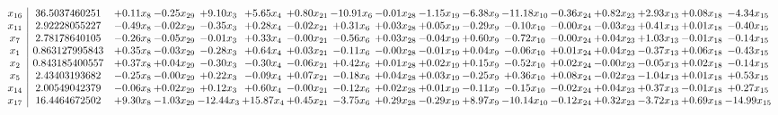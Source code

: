\documentclass[9pt]{article}
\begin{document}
\[\begin{array}{c| c c@{\hskip 2pt} c@{\hskip 2pt} c@{\hskip 2pt} c@{\hskip 2pt} c@{\hskip 2pt} c@{\hskip 2pt} c@{\hskip 2pt} c@{\hskip 2pt} c@{\hskip 2pt} c@{\hskip 2pt} c@{\hskip 2pt} c@{\hskip 2pt} c@{\hskip 2pt} c@{\hskip 2pt} c@{\hskip 2pt} }
 x_{16}   &  36.5037460251 & +  0.11 x_{8} & -0.25 x_{29} & +  9.10 x_{3} & +  5.65 x_{4} & +  0.80 x_{21} & -10.91 x_{6} & -0.01 x_{28} & -1.15 x_{19} & -6.38 x_{9} & -11.18 x_{10} & -0.36 x_{24} & +  0.82 x_{23} & +  2.93 x_{13} & +  0.08 x_{18} & -4.34 x_{15}\\
 x_{11}   &  2.92228055227 & -0.49 x_{8} & -0.02 x_{29} & -0.35 x_{3} & +  0.28 x_{4} & -0.02 x_{21} & +  0.31 x_{6} & +  0.03 x_{28} & +  0.05 x_{19} & -0.29 x_{9} & -0.10 x_{10} & -0.00 x_{24} & -0.03 x_{23} & +  0.41 x_{13} & +  0.01 x_{18} & -0.40 x_{15}\\
 x_{7}   &  2.78178640105 & -0.26 x_{8} & -0.05 x_{29} & -0.01 x_{3} & +  0.33 x_{4} & -0.00 x_{21} & -0.56 x_{6} & +  0.03 x_{28} & -0.04 x_{19} & +  0.60 x_{9} & -0.72 x_{10} & -0.00 x_{24} & +  0.04 x_{23} & +  1.03 x_{13} & -0.01 x_{18} & -0.14 x_{15}\\
 x_{1}   &  0.863127995843 & +  0.35 x_{8} & -0.03 x_{29} & -0.28 x_{3} & +  0.64 x_{4} & +  0.03 x_{21} & -0.11 x_{6} & -0.00 x_{28} & -0.01 x_{19} & +  0.04 x_{9} & -0.06 x_{10} & +  0.01 x_{24} & +  0.04 x_{23} & -0.37 x_{13} & +  0.06 x_{18} & -0.43 x_{15}\\
 x_{2}   &  0.843185400557 & +  0.37 x_{8} & +  0.04 x_{29} & -0.30 x_{3} & -0.30 x_{4} & -0.06 x_{21} & +  0.42 x_{6} & +  0.01 x_{28} & +  0.02 x_{19} & +  0.15 x_{9} & -0.52 x_{10} & +  0.02 x_{24} & -0.00 x_{23} & -0.05 x_{13} & +  0.02 x_{18} & -0.14 x_{15}\\
 x_{5}   &  2.43403193682 & -0.25 x_{8} & -0.00 x_{29} & +  0.22 x_{3} & -0.09 x_{4} & +  0.07 x_{21} & -0.18 x_{6} & +  0.04 x_{28} & +  0.03 x_{19} & -0.25 x_{9} & +  0.36 x_{10} & +  0.08 x_{24} & -0.02 x_{23} & -1.04 x_{13} & +  0.01 x_{18} & +  0.53 x_{15}\\
 x_{14}   &  2.00549042379 & -0.06 x_{8} & +  0.02 x_{29} & +  0.12 x_{3} & +  0.60 x_{4} & -0.00 x_{21} & -0.12 x_{6} & +  0.02 x_{28} & +  0.01 x_{19} & -0.11 x_{9} & -0.15 x_{10} & -0.02 x_{24} & +  0.04 x_{23} & +  0.37 x_{13} & -0.01 x_{18} & +  0.27 x_{15}\\
 x_{17}   &  16.4464672502 & +  9.30 x_{8} & -1.03 x_{29} & -12.44 x_{3} & + 15.87 x_{4} & +  0.45 x_{21} & -3.75 x_{6} & +  0.29 x_{28} & -0.29 x_{19} & +  8.97 x_{9} & -10.14 x_{10} & -0.12 x_{24} & +  0.32 x_{23} & -3.72 x_{13} & +  0.69 x_{18} & -14.99 x_{15}\\

\end{array}\]
\end{document}
